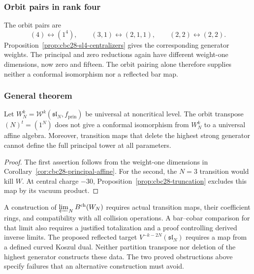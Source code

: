 \subsubsection*{Orbit pairs in rank four}

The orbit pairs are
\[
 (4)\longleftrightarrow(1^4),\qquad
 (3,1)\longleftrightarrow(2,1,1),\qquad
 (2,2)\longleftrightarrow(2,2).
\]
Proposition~\ref{prop:cbc28-sl4-centralizers} gives the corresponding generator weights.
The principal and zero reductions again have different weight-one dimensions, now zero and fifteen.
The orbit pairing alone therefore supplies neither a conformal isomorphism nor a reflected bar map.

\subsubsection*{General theorem}

\begin{proposition}\label{thm:winfty-factorization-kd}
Let $W_N^k=\mathcal W^k(\mathfrak{sl}_N,f_{\mathrm{prin}})$ be universal at noncritical level.
The orbit transpose $(N)^t=(1^N)$ does not give a conformal isomorphism from $W_N^k$ to a universal affine algebra.
Moreover, transition maps that delete the highest strong generator cannot define the full principal tower at all parameters.
\end{proposition}
\begin{proof}
The first assertion follows from the weight-one dimensions in Corollary~\ref{cor:cbc28-principal-affine}.
For the second, the $N=3$ transition would kill $W$.
At central charge $-30$, Proposition~\ref{prop:cbc28-truncation} excludes this map by its vacuum product.
\end{proof}

\begin{remark}
\label{eq:winfty-stage-kd}
A construction of $\varprojlim_N B^{\mathrm{ch}}(W_N)$ requires actual transition maps, their coefficient rings, and compatibility with all collision operations.
A bar--cobar comparison for that limit also requires a justified totalization and a proof controlling derived inverse limits.
The proposed reflected target $V^{-k-2N}(\mathfrak{sl}_N)$ requires a map from a defined curved Koszul dual.
Neither partition transpose nor deletion of the highest generator constructs these data.
The two proved obstructions above specify failures that an alternative construction must avoid.
\end{remark}

